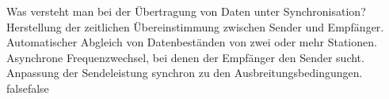     {Was versteht man bei der Übertragung von Daten unter Synchronisation?}
    {Herstellung der zeitlichen Übereinstimmung zwischen Sender und Empfänger.}
    {Automatischer Abgleich von Datenbeständen von zwei oder mehr Stationen.}
    {Asynchrone Frequenzwechsel, bei denen der Empfänger den Sender sucht.}
    {Anpassung der Sendeleistung synchron zu den Ausbreitungsbedingungen.}
    {false}{false}